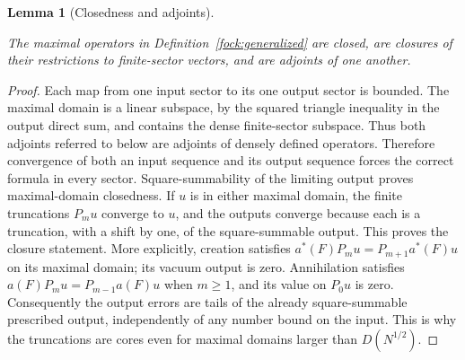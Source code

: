 \documentclass[11pt,a4paper]{article}
\newtheorem{lemma}[theorem]{Lemma}
\theoremstyle{definition}
\theoremstyle{remark}
\newcommand{\proofid}[1]{\par\smallskip{\normalfont\scriptsize\color{inkblue}Stable ID: \nolinkurl{#1}}\par\smallskip}
\begin{document}
\begin{lemma}[Closedness and adjoints]\label{fock:adjoints}
\proofid{fock:adjoints}
\par{}\par\smallskip

The maximal operators in Definition~\ref{fock:generalized} are closed,
are closures of their restrictions to finite-sector vectors, and are
adjoints of one another.
\end{lemma}
\begin{proof}
Each map from one input sector to its one output sector is bounded.
The maximal domain is a linear subspace, by the squared triangle
inequality in the output direct sum, and contains the dense
finite-sector subspace. Thus both adjoints referred to below are
adjoints of densely defined operators.
Therefore convergence of both an input sequence and its output sequence
forces the correct formula in every sector. Square-summability of the
limiting output proves maximal-domain closedness. If $u$ is in either
maximal domain, the finite truncations $P_mu$ converge to $u$, and the
outputs converge because each is a truncation, with a shift by one, of
the square-summable output. This proves the closure statement.
More explicitly, creation satisfies
$a^*(F)P_mu=P_{m+1}a^*(F)u$ on its maximal domain; its vacuum
output is zero. Annihilation satisfies
$a(F)P_mu=P_{m-1}a(F)u$ when $m\geq1$, and its value on $P_0u$
is zero. Consequently the output errors are tails of the already
square-summable prescribed output, independently of any number
bound on the input. This is why the truncations are cores even
for maximal domains larger than $D(N^{1/2})$.


\end{proof}
\end{document}
